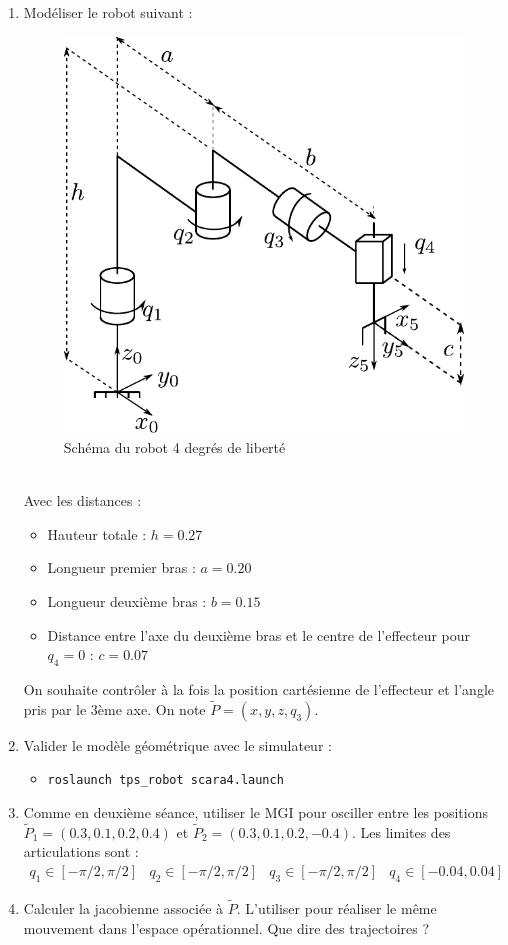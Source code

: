 \documentclass[12pt,a4paper]{article}
\begin{document}
\begin{enumerate}
\item Modéliser le robot suivant :
\begin{figure}[h]
  \centering
  \includegraphics[width=.4\linewidth]{figs/scara4}
  \caption{Schéma du robot 4 degrés de liberté}
  \label{fig:3RP}
\end{figure}\\
Avec les distances :
\begin{itemize}
\item Hauteur totale : $h=0.27$
\item Longueur premier bras : $a=0.20$
\item Longueur deuxième bras : $b = 0.15$
\item Distance entre l'axe du deuxième bras et le centre de l'effecteur pour $q_4=0$ : $c=0.07$
\end{itemize}
On souhaite contrôler à la fois la position cartésienne de l'effecteur et l'angle pris par le 3ème axe. On note $\tilde{P} = (x,y,z,q_3)$.\\

\item Valider le modèle géométrique avec le simulateur :
\begin{itemize}
\item \texttt{roslaunch tps\_robot scara4.launch}
\end{itemize}
\item 
Comme en deuxième séance, utiliser le MGI pour osciller entre les positions $\tilde{P}_1=(0.3,0.1,0.2,0.4)$ et $\tilde{P}_2=(0.3,0.1,0.2,-0.4)$.
Les limites des articulations sont :
  \begin{equation*}
  \begin{array}{cccc}
  q_1\in[-\pi/2,\pi/2] & q_2 \in [-\pi/2,\pi/2] & q_3\in[-\pi/2,\pi/2] & q_4\in[-0.04,0.04]
  \end{array}
  \end{equation*}
\item Calculer la jacobienne associée à $\tilde{P}$. L'utiliser pour réaliser le même mouvement dans l'espace opérationnel. Que dire des trajectoires ?
\end{enumerate}
\end{document}

